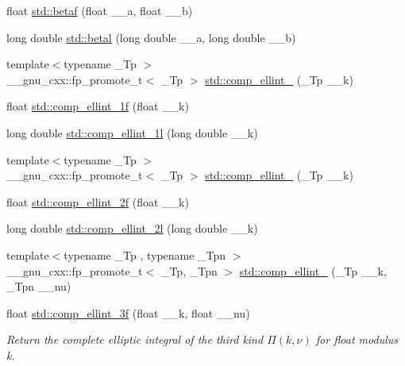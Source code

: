 \begin{DoxyCompactItemize}
\item 
float \hyperlink{group__mathsf__std_ga12dc61ee4c09172151cf092ed387e203}{std\+::betaf} (float \+\_\+\+\_\+a, float \+\_\+\+\_\+b)
\item 
long double \hyperlink{group__mathsf__std_ga8caca1cef099f41a88111209c36ce06c}{std\+::betal} (long double \+\_\+\+\_\+a, long double \+\_\+\+\_\+b)
\item 
{\footnotesize template$<$typename \+\_\+\+Tp $>$ }\\\+\_\+\+\_\+gnu\+\_\+cxx\+::fp\+\_\+promote\+\_\+t$<$ \+\_\+\+Tp $>$ \hyperlink{group__mathsf__std_gad559217fb01e7a8b7a6e23eeedda64be}{std\+::comp\+\_\+ellint\+\_} (\+\_\+\+Tp \+\_\+\+\_\+k)
\item 
float \hyperlink{group__mathsf__std_ga7fb5be999a8125cf7e55e630eb8444a1}{std\+::comp\+\_\+ellint\+\_\+1f} (float \+\_\+\+\_\+k)
\item 
long double \hyperlink{group__mathsf__std_ga7247d3dd77c1ff5df3c059fed862dc48}{std\+::comp\+\_\+ellint\+\_\+1l} (long double \+\_\+\+\_\+k)
\item 
{\footnotesize template$<$typename \+\_\+\+Tp $>$ }\\\+\_\+\+\_\+gnu\+\_\+cxx\+::fp\+\_\+promote\+\_\+t$<$ \+\_\+\+Tp $>$ \hyperlink{group__mathsf__std_gaadf288465eea84ec609d93de96200aaa}{std\+::comp\+\_\+ellint\+\_} (\+\_\+\+Tp \+\_\+\+\_\+k)
\item 
float \hyperlink{group__mathsf__std_ga21700f2f125c42b1f1da1f9c7eea1135}{std\+::comp\+\_\+ellint\+\_\+2f} (float \+\_\+\+\_\+k)
\item 
long double \hyperlink{group__mathsf__std_ga47b647ec386c8d4b18a030c97842df18}{std\+::comp\+\_\+ellint\+\_\+2l} (long double \+\_\+\+\_\+k)
\item 
{\footnotesize template$<$typename \+\_\+\+Tp , typename \+\_\+\+Tpn $>$ }\\\+\_\+\+\_\+gnu\+\_\+cxx\+::fp\+\_\+promote\+\_\+t$<$ \+\_\+\+Tp, \+\_\+\+Tpn $>$ \hyperlink{group__mathsf__std_ga80419d323d3231870bd588525e818974}{std\+::comp\+\_\+ellint\+\_} (\+\_\+\+Tp \+\_\+\+\_\+k, \+\_\+\+Tpn \+\_\+\+\_\+nu)
\item 
float \hyperlink{group__mathsf__std_ga76834d3112f777703330892303267a39}{std\+::comp\+\_\+ellint\+\_\+3f} (float \+\_\+\+\_\+k, float \+\_\+\+\_\+nu)
\begin{DoxyCompactList}\small\item\em Return the complete elliptic integral of the third kind $ \Pi(k,\nu) $ for {\ttfamily float} modulus {\ttfamily k}. \end{DoxyCompactList}\item 

\end{DoxyCompactItemize}
